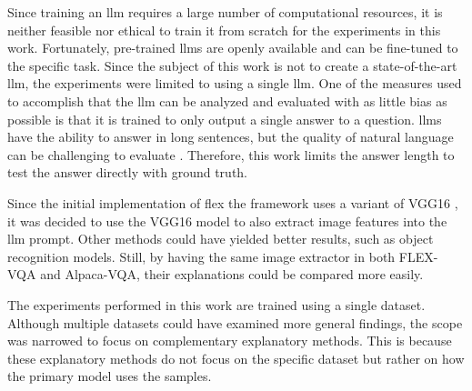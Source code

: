     
    
    Since training an \gls{llm} requires a large number of computational resources, it is neither feasible nor ethical to train it from scratch for the experiments in this work. Fortunately, pre-trained \glspl{llm} are openly available and can be fine-tuned to the specific task. Since the subject of this work is not to create a state-of-the-art \gls{llm}, the experiments were limited to using a single \gls{llm}.
    One of the measures used to accomplish that the \gls{llm} can be analyzed and evaluated with as little bias as possible is that it is trained to only output a single answer to a question. \glspl{llm} have the ability to answer in long sentences, but the quality of natural language can be challenging to evaluate \cite{reiterStructuredReviewValidity2018}. Therefore, this work limits the answer length to test the answer directly with ground truth.

    Since the initial implementation of \gls{flex} the framework uses a variant of VGG16 \cite{simonyanVeryDeepConvolutional2015, gaoCompactBilinearPooling2016}, it was decided to use the VGG16 model to also extract image features into the \gls{llm} prompt. 
    Other methods could have yielded better results, such as object recognition models. Still, by having the same image extractor in both FLEX-VQA and Alpaca-VQA, their explanations could be compared more easily.


    The experiments performed in this work are trained using a single dataset. Although multiple datasets could have examined more general findings, the scope was narrowed to focus on complementary explanatory methods. This is because these explanatory methods do not focus on the specific dataset but rather on how the primary model uses the samples.
    
   
    
